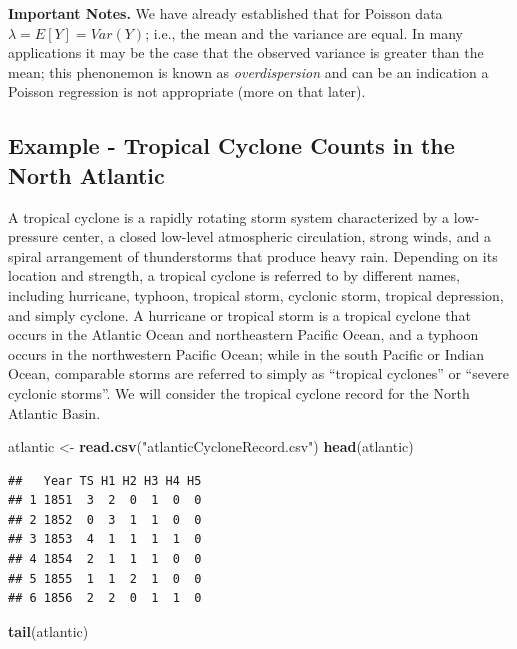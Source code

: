 \documentclass[
]{book}
\newenvironment{Shaded}{\begin{snugshade}}{\end{snugshade}}
\newcommand{\FunctionTok}[1]{\textcolor[rgb]{0.13,0.29,0.53}{\textbf{#1}}}
\newcommand{\NormalTok}[1]{#1}
\newcommand{\OtherTok}[1]{\textcolor[rgb]{0.56,0.35,0.01}{#1}}
\newcommand{\StringTok}[1]{\textcolor[rgb]{0.31,0.60,0.02}{#1}}
\begin{document}
\textbf{Important Notes.} We have already established that for Poisson data \(\lambda = E[Y] = Var(Y)\); i.e., the mean and the variance are equal. In many applications it may be the case that the observed variance is greater than the mean; this phenonemon is known as \emph{overdispersion} and can be an indication a Poisson regression is not appropriate (more on that later).

\hypertarget{example---tropical-cyclone-counts-in-the-north-atlantic}{%
\subsection{Example - Tropical Cyclone Counts in the North Atlantic}\label{example---tropical-cyclone-counts-in-the-north-atlantic}}

A tropical cyclone is a rapidly rotating storm system characterized by a low-pressure center, a closed low-level atmospheric circulation, strong winds, and a spiral arrangement of thunderstorms that produce heavy rain. Depending on its location and strength, a tropical cyclone is referred to by different names, including hurricane, typhoon, tropical storm, cyclonic storm, tropical depression, and simply cyclone. A hurricane or tropical storm is a tropical cyclone that occurs in the Atlantic Ocean and northeastern Pacific Ocean, and a typhoon occurs in the northwestern Pacific Ocean; while in the south Pacific or Indian Ocean, comparable storms are referred to simply as ``tropical cyclones'' or ``severe cyclonic storms''. We will consider the tropical cyclone record for the North Atlantic Basin.

\begin{Shaded}
\begin{Highlighting}[]
\NormalTok{atlantic }\OtherTok{\textless{}{-}} \FunctionTok{read.csv}\NormalTok{(}\StringTok{"atlanticCycloneRecord.csv"}\NormalTok{)}
\FunctionTok{head}\NormalTok{(atlantic)}
\end{Highlighting}
\end{Shaded}

\begin{verbatim}
##   Year TS H1 H2 H3 H4 H5
## 1 1851  3  2  0  1  0  0
## 2 1852  0  3  1  1  0  0
## 3 1853  4  1  1  1  1  0
## 4 1854  2  1  1  1  0  0
## 5 1855  1  1  2  1  0  0
## 6 1856  2  2  0  1  1  0
\end{verbatim}

\begin{Shaded}
\begin{Highlighting}[]
\FunctionTok{tail}\NormalTok{(atlantic)}
\end{Highlighting}
\end{Shaded}
\end{document}

